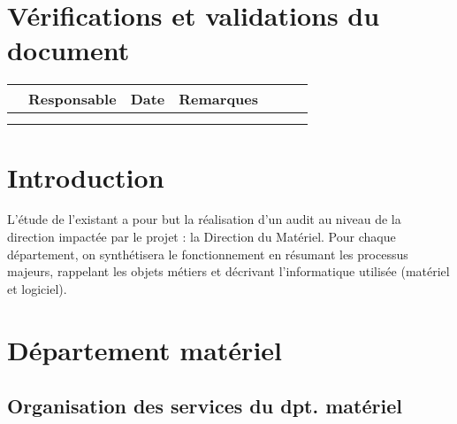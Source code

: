 \documentclass[twoside]{article}
\begin{document}

\section*{Vérifications et validations du document}

\begin{center}
\begin{longtable}{|m{15mm}|m{36mm}|m{36mm}|m{60mm}|}
\hline
 & Responsable & Date & Remarques\endhead \hline
& %
& %
& %
\\\hline

& %

& %

& %

\\\hline

& %

& %

& %

\\\hline
\end{longtable}
\end{center}

\pagebreak


\tableofcontents
\vfill
\pagebreak


\section{Introduction}

L'étude de l'existant a pour but la réalisation d'un audit au niveau de la
direction impactée par le projet : la Direction du Matériel. Pour chaque
département, on synthétisera le fonctionnement en résumant les processus
majeurs, rappelant les objets métiers et décrivant l'informatique utilisée
(matériel et logiciel).


\section{Département matériel}

\subsection{Organisation des services du dpt. matériel}
\end{document}

